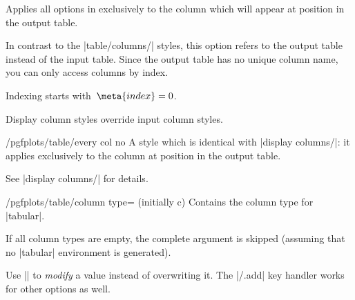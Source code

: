 \documentclass[a4paper]{ltxdoc}
\begin{document}
\begin{pgfplotstabledisplaycolumnkey}
    Applies all options in  exclusively to the column
    which will appear at position  in the output table.

    In contrast to the |table/columns/| styles, this option refers
    to the output table instead of the input table. Since the output table has
    no unique column name, you can only access columns by index.

    Indexing starts with~$\meta{index}=0$.

    Display column styles override input column styles.
\end{pgfplotstabledisplaycolumnkey}

\begin{stylekey}{/pgfplots/table/every col no }
    A style which is identical with |display columns/|: it applies
    exclusively to the column at position  in the output table.

    See |display columns/| for details.
\end{stylekey}

\begin{key}{/pgfplots/table/column type= (initially c)}
    Contains the column type for |tabular|.

    If all column types are empty, the complete argument is skipped (assuming
    that no |tabular| environment is generated).

    Use || to
    \emph{modify} a value instead of overwriting it. The |/.add| key handler
    works for other options as well.
\begin{codeexample}[narrow]
\end{codeexample}
\end{key}
\end{document}
